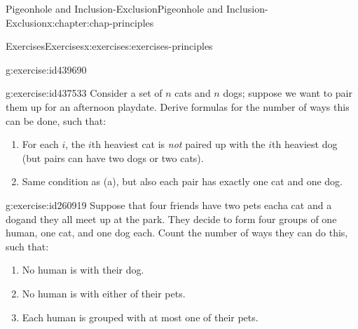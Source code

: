 \documentclass[oneside,10pt,]{book}
\numberwithin{equation}{section}
\begin{document}
\begin{chapterptx}{Pigeonhole and Inclusion-Exclusion}{}{Pigeonhole and Inclusion-Exclusion}{}{}{x:chapter:chap-principles}
\begin{exercises-section}{Exercises}{}{Exercises}{}{}{x:exercises:exercises-principles}
\begin{divisionexercise}{16}{}{}{g:exercise:id439690}
\begin{sidebyside}{1}{0.3}{0.3}{0}
\begin{sbspanel}{0.4}
%
\end{sbspanel}%
\end{sidebyside}%
\end{divisionexercise}%
\begin{divisionexercise}{17}{}{}{g:exercise:id437533}%
Consider a set of \(n\) cats and \(n\) dogs; suppose we want to pair them up for an afternoon playdate. Derive formulas for the number of ways this can be done, such that:%
\begin{enumerate}[label=(\alph*)]
\item{}For each \(i\), the \(i\)th heaviest cat is \emph{not} paired up with the \(i\)th heaviest dog (but pairs can have two dogs or two cats).%
\item{}Same condition as (a), but also each pair has exactly one cat and one dog.%
\end{enumerate}
%
\end{divisionexercise}%
\begin{divisionexercise}{18}{}{}{g:exercise:id260919}%
Suppose that four friends have two pets each\textemdash{}a cat and a dog\textemdash{}and they all meet up at the park. They decide to form four groups of one human, one cat, and one dog each. Count the number of ways they can do this, such that:%
\begin{enumerate}[label=(\alph*)]
\item{}No human is with their dog.%
\item{}No human is with either of their pets.%
\item{}Each human is grouped with at most one of their pets.%
\end{enumerate}
%
\end{divisionexercise}%
\end{exercises-section}
\end{chapterptx}
%
%
\typeout{************************************************}
\typeout{************************************************}
%
\end{document}
